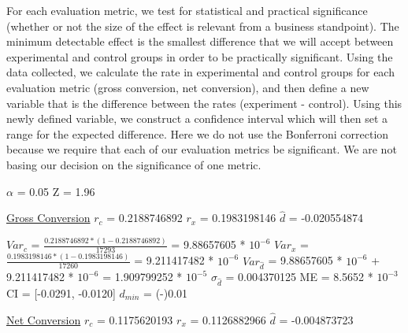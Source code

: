\documentclass[paper=a4, fontsize=11pt]{scrartcl} %
\numberwithin{equation}{section} %
\numberwithin{figure}{section} %
\numberwithin{table}{section} %
\begin{document}
For each evaluation metric, we test for statistical and practical significance (whether or not the size of the effect is relevant from a business standpoint).  The minimum detectable effect is the smallest difference that we will accept between experimental and control groups in order to be practically significant.  Using the data collected, we calculate the rate in experimental and control groups for each evaluation metric (gross conversion, net conversion), and then define a new variable that is the difference between the rates (experiment - control).  Using this newly defined variable, we construct a confidence interval which will then set a range for the expected difference.  Here we do not use the Bonferroni correction because we require that each of our evaluation metrics be significant.  We are not basing our decision on the significance of one metric.  \newline

$\alpha$ = 0.05
\newline
Z = 1.96
\newline
\newline

\underline{Gross Conversion} \newline
\newline
$r_{c}$ = 0.2188746892
\newline
$r_{x}$ = 0.1983198146
\newline
$\widehat{d}$ = -0.020554874
\newline

$Var_{c}$ = $\frac{0.2188746892 * (1 - 0.2188746892)}{17293}$ = 9.88657605 * $10^{-6}$
\newline
$Var_{x}$ = $\frac{0.1983198146 * (1 - 0.1983198146)}{17260}$ = 9.211417482 * $10^{-6}$
\newline
$Var_{\widehat{d}}$ = 9.88657605 * $10^{-6}$ + 9.211417482 * $10^{-6}$ = 1.909799252 * $10^{-5}$
\newline
\newline
$\sigma_{\widehat{d}}$ = 0.004370125
\newline
ME = 8.5652 * $10^{-3}$
\newline
CI = [-0.0291, -0.0120]
\newline
$d_{min}$ = (-)0.01
\newline
\newline


\underline{Net Conversion} \newline
\newline
$r_{c}$ = 0.1175620193
\newline
$r_{x}$ = 0.1126882966
\newline
$\widehat{d}$ = -0.004873723
\newline
\end{document}

